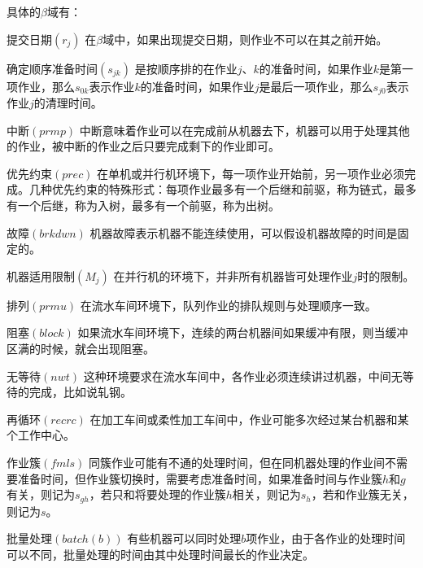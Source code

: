 具体的$\beta$域有：
\begin{compactdesc}
\item[提交日期$(r_j)$]在$\beta$域中，如果出现提交日期，则作业不可以在其之前开始。
\item[确定顺序准备时间$(s_{jk})$]是按顺序排的在作业$j$、$k$的准备时间，如果作业$k$是第一项作业，那么$s_{0k}$表示作业$k$的准备时间，如果作业$j$是最后一项作业，那么$s_{j0}$表示作业$j$的清理时间。
\item[中断$(prmp)$]中断意味着作业可以在完成前从机器去下，机器可以用于处理其他的作业，被中断的作业之后只要完成剩下的作业即可。
\item[优先约束$(prec)$]在单机或并行机环境下，每一项作业开始前，另一项作业必须完成。几种优先约束的特殊形式：每项作业最多有一个后继和前驱，称为链式，最多有一个后继，称为入树，最多有一个前驱，称为出树。
\item[故障$(brkdwn)$]机器故障表示机器不能连续使用，可以假设机器故障的时间是固定的。
\item[机器适用限制$(M_j)$]在并行机的环境下，并非所有机器皆可处理作业$j$时的限制。
\item[排列$(prmu)$]在流水车间环境下，队列作业的排队规则与处理顺序一致。
\item[阻塞$(block)$]如果流水车间环境下，连续的两台机器间如果缓冲有限，则当缓冲区满的时候，就会出现阻塞。
\item[无等待$(nwt)$]这种环境要求在流水车间中，各作业必须连续讲过机器，中间无等待的完成，比如说轧钢。
\item[再循环$(recrc)$]在加工车间或柔性加工车间中，作业可能多次经过某台机器和某个工作中心。
\item[作业簇$(fmls)$]同簇作业可能有不通的处理时间，但在同机器处理的作业间不需要准备时间，但作业簇切换时，需要考虑准备时间，如果准备时间与作业簇$h$和$g$有关，则记为$s_{gh}$，若只和将要处理的作业簇$h$相关，则记为$s_h$，若和作业簇无关，则记为$s$。
\item[批量处理$(batch(b))$]有些机器可以同时处理$b$项作业，由于各作业的处理时间可以不同，批量处理的时间由其中处理时间最长的作业决定。
\end{compactdesc}

